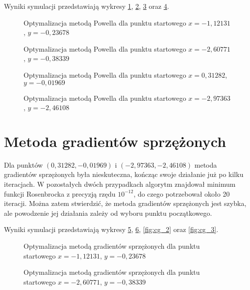 Wyniki symulacji przedstawiają wykresy \ref{fig:powell_0}, \ref{fig:powell_1}, \ref{fig:powell_2} oraz \ref{fig:powell_3}.

\begin{figure}
  \centering
  
  \caption{Optymalizacja metodą Powella dla punktu startowego $x=-1,12131$, $y=-0,23678$}
  \label{fig:powell_0}
\end{figure}

\begin{figure}
  \centering
  
  \caption{Optymalizacja metodą Powella dla punktu startowego $x=-2,60771$, $y=-0,38339$}
  \label{fig:powell_1}
\end{figure}

\begin{figure}
  \centering
  
  \caption{Optymalizacja metodą Powella dla punktu startowego $x=0,31282$, $y=-0,01969$}
  \label{fig:powell_2}
\end{figure}

\begin{figure}
  \centering
  
  \caption{Optymalizacja metodą Powella dla punktu startowego $x=-2,97363$, $y=-2,46108$}
  \label{fig:powell_3}
\end{figure}


\section{Metoda gradientów sprzężonych}
Dla punktów $(0,31282, -0,01969)$ i $(-2,97363, -2,46108)$ metoda gradientów sprzężonych była nieskuteczna, kończąc swoje działanie już po kilku iteracjach. W pozostałych dwóch przypadkach algorytm znajdował minimum funkcji Rosenbrocka z precyzją rzędu $10^{-12}$, do czego potrzebował około 20 iteracji. Można zatem stwierdzić, że metoda gradientów sprzężonych jest szybka, ale powodzenie jej działania zależy od wyboru punktu początkowego. 

Wyniki symulacji przedstawiają wykresy \ref{fig:cg_0}, \ref{fig:cg_1}, \ref{fig:cg_2} oraz \ref{fig:cg_3}.

\begin{figure}
  \centering
  
  \caption{Optymalizacja metodą gradientów sprzężonych dla punktu startowego $x=-1,12131$, $y=-0,23678$}
  \label{fig:cg_0}
\end{figure}

\begin{figure}
  \centering
  
  \caption{Optymalizacja metodą gradientów sprzężonych dla punktu startowego $x=-2,60771$, $y=-0,38339$}
  \label{fig:cg_1}
\end{figure}

